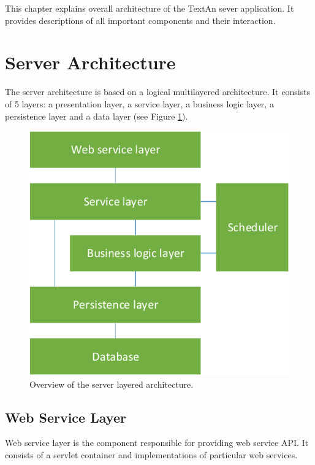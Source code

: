 
This chapter explains overall architecture of the TextAn sever application. It
provides descriptions of all important components and their interaction.

\section{Server Architecture}

The server architecture is based on a logical multilayered architecture. It
consists of 5 layers: a presentation layer, a service layer, a business logic
layer, a persistence layer and a data layer (see Figure
\ref{fig:ServerComponentOverview}).

\begin{figure}[!htb]
        \centering
        \includegraphics{Images/ServerComponentOverview}
        \caption{Overview of the server layered architecture.}
        \label{fig:ServerComponentOverview}
\end{figure}

\subsection{Web Service Layer}

Web service layer is the component responsible for providing web service
API. It consists of a servlet container and implementations of particular
web services.

